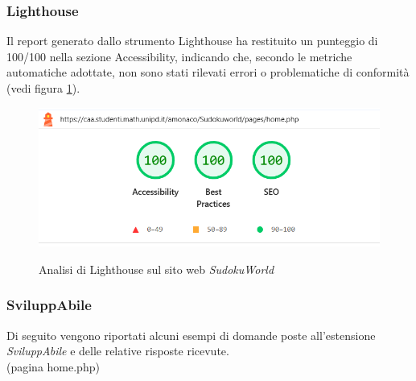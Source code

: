 \subsubsection{Lighthouse}
\noindent Il report generato dallo strumento Lighthouse ha restituito un punteggio di 100/100 nella sezione Accessibility, indicando che, secondo le metriche automatiche adottate, non sono stati rilevati errori o problematiche di conformità (vedi figura \ref{fig:Lighthouse_sudoku}).
\begin{figure}[H]
    \centering
    \includegraphics[width=0.6\linewidth, alt={Screenshot dell'analisi di Lighthouse sul sito web SudokuWorld}]{img/Lighthouse_sudoku.png}
    \caption{Analisi di Lighthouse sul sito web \textit{SudokuWorld}}\label{fig:Lighthouse_sudoku}
\end{figure}

\subsubsection{SviluppAbile}
\noindent Di seguito vengono riportati alcuni esempi di domande poste all’estensione \textit{SviluppAbile} e delle relative risposte ricevute. \newline
\\ \vspace{-0.5cm}
\noindent(pagina home.php)\\
